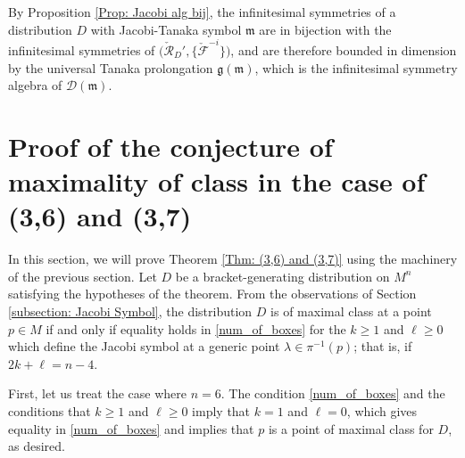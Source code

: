 \documentclass[11pt,letterpaper]{amsart}
\numberwithin{equation}{section}
\newcommand{\oline}{\overline}
\begin{document}

By Proposition \ref{Prop: Jacobi alg bij}, the infinitesimal symmetries of a distribution $D$ with Jacobi-Tanaka symbol $\mathfrak m$ are in bijection with the infinitesimal symmetries of $\big(\check{\mathcal R}_D',\{\check {\mathcal {F}}^{-i}\}\big)$, and are therefore bounded in dimension by the universal Tanaka prolongation $\mathfrak g(\mathfrak m)$, which is the infinitesimal symmetry algebra of $\mathcal D(\mathfrak m)$.

\section{Proof of the conjecture of maximality of class in the case of (3,6) and (3,7)}
\label{section: dim 6-7}

In this section, we will prove Theorem \ref{Thm: (3,6) and (3,7)} using the machinery of the previous section. Let $D$ be a bracket-generating distribution on $M^n$ satisfying the hypotheses of the theorem. From the observations of Section \ref{subsection: Jacobi Symbol}, the distribution $D$ is of maximal class at a point $p\in M$ if and only if equality holds in \eqref{num_of_boxes} for the $k\geq 1$ and $\ell\geq 0$ which define the Jacobi symbol at a generic point $\lambda\in \pi^{-1}(p)$; that is, if $2k+\ell=n-4$. 

First, let us treat the case where $n=6$. The condition \eqref{num_of_boxes} and the conditions that $k\geq 1$ and $\ell\geq 0$ imply that $k=1$ and $\ell=0$, which gives equality in \eqref{num_of_boxes} and implies that $p$ is a point of maximal class for $D$, as desired.
\end{document}
